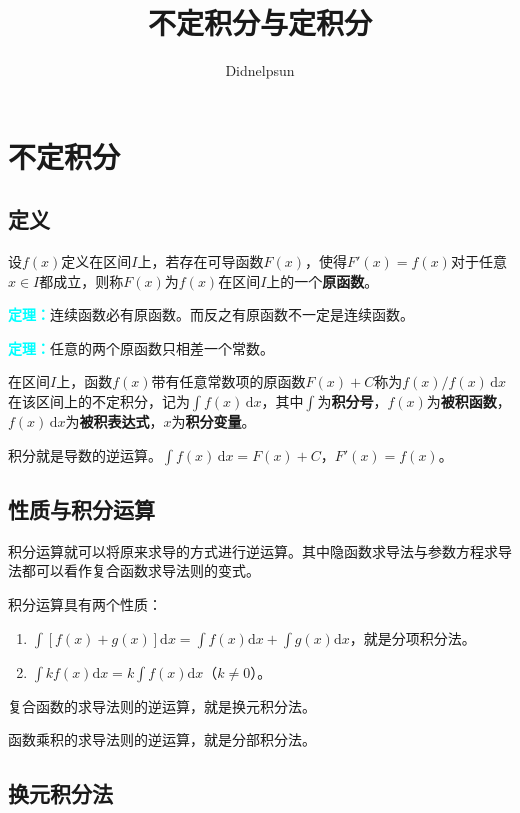 \documentclass[UTF8, 12pt]{ctexart}
\author{Didnelpsun}
\title{不定积分与定积分}
\date{}
\begin{document}
\maketitle
\pagestyle{empty}
\thispagestyle{empty}
\tableofcontents
\thispagestyle{empty}
\newpage
\pagestyle{plain}
\setcounter{page}{1}
\section{不定积分}

\subsection{定义}

设$f(x)$定义在区间$I$上，若存在可导函数$F(x)$，使得$F'(x)=f(x)$对于任意$x\in I$都成立，则称$F(x)$为$f(x)$在区间$I$上的一个\textbf{原函数}。

\textcolor{aqua}{\textbf{定理：}}连续函数必有原函数。而反之有原函数不一定是连续函数。

\textcolor{aqua}{\textbf{定理：}}任意的两个原函数只相差一个常数。

在区间$I$上，函数$f(x)$带有任意常数项的原函数$F(x)+C$称为$f(x)/f(x)\,\textrm{d}x$在该区间上的不定积分，记为$\int f(x)\,\textrm{d}x$，其中$\int$为\textbf{积分号}，$f(x)$为\textbf{被积函数}，$f(x)\,\textrm{d}x$为\textbf{被积表达式}，$x$为\textbf{积分变量}。

积分就是导数的逆运算。$\int f(x)\,\textrm{d}x=F(x)+C$，$F'(x)=f(x)$。 

\subsection{性质与积分运算}

积分运算就可以将原来求导的方式进行逆运算。其中隐函数求导法与参数方程求导法都可以看作复合函数求导法则的变式。

积分运算具有两个性质：

\begin{enumerate}
    \item $\int[f(x)+g(x)]\textrm{d}x=\int f(x)\textrm{d}x+\int g(x)\textrm{d}x$，就是分项积分法。
    \item $\int kf(x)\textrm{d}x=k\int f(x)\textrm{d}x$（$k\neq 0$）。
\end{enumerate}

复合函数的求导法则的逆运算，就是换元积分法。

函数乘积的求导法则的逆运算，就是分部积分法。

\subsection{换元积分法}
\end{document}
